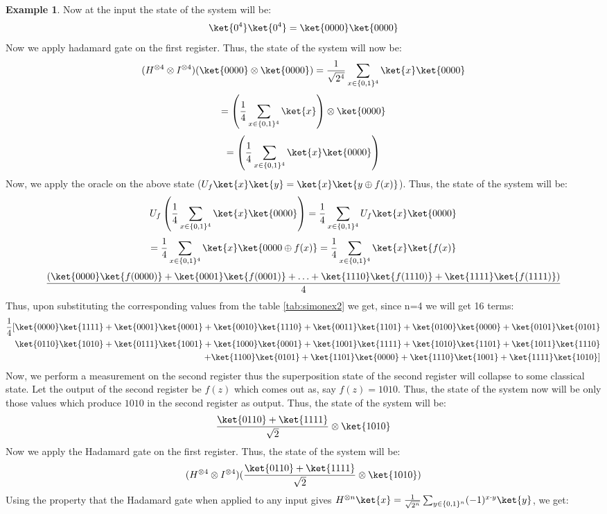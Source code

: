 \documentclass[12pt, oneside]{book}
\theoremstyle{definition}
\theoremstyle{definition}
\newtheorem{example}{Example}[section]
\theoremstyle{remark}
\begin{document}
\begin{example}
    Now at the input the state of the system will be:
    \[
        \ket{0^4}\ket{0^4}=\ket{0000}\ket{0000}
    \]
    Now we apply hadamard gate on the first register. Thus, the state of the system will now be:
    \[
        (H^{\otimes 4} \otimes I^{\otimes 4})(\ket{0000}\otimes \ket{0000})=\frac{1}{\sqrt{2^4}}\sum_{x \in \{0,1\}^4}\ket{x}\ket{0000}
    \]
    \[
        =\left(\frac{1}{4}\sum_{x \in \{0,1\}^4}\ket{x}\right) \otimes \ket{0000}
    \]
    \[
        =\left(\frac{1}{4}\sum_{x \in \{0,1\}^4}\ket{x}\ket{0000}\right)
    \]
    Now, we apply the oracle on the above state ($U_f\ket{x}\ket{y}=\ket{x}\ket{y\oplus f(x)}$). Thus, the state of the system will be:
    \[
    U_f\left(\frac{1}{4}\sum_{x \in \{0,1\}^4}\ket{x}\ket{0000}\right)=\frac{1}{4}\sum_{x \in \{0,1\}^4}U_f\ket{x}\ket{0000}
    \]
    \[
    =\frac{1}{4}\sum_{x\in\{0,1\}^4}\ket{x}\ket{0000 \oplus f(x)}=\frac{1}{4}\sum_{x \in \{0,1\}^4}\ket{x}\ket{f(x)}
    \]
    \[
        \frac{(\ket{0000}\ket{f(0000)}+\ket{0001}\ket{f(0001)}+\ldots +\ket{1110}\ket{f(1110)}+\ket{1111}\ket{f(1111)})}{4}
    \]
    Thus, upon substituting the corresponding values from the table \ref{tab:simonex2} we get, since n=4 we will get 16 terms:
    \begin{align*}
    \frac{1}{4}[\ket{0000}\ket{1111}+\ket{0001}\ket{0001}+\ket{0010}\ket{1110}+\ket{0011}\ket{1101}+\ket{0100}\ket{0000}+\ket{0101}\ket{0101}\\
    \ket{0110}\ket{1010}+\ket{0111}\ket{1001} +\ket{1000}\ket{0001}+\ket{1001}\ket{1111}+\ket{1010}\ket{1101}+\ket{1011}\ket{1110}\\
    +\ket{1100}\ket{0101}+\ket{1101}\ket{0000}+\ket{1110}\ket{1001}+\ket{1111}\ket{1010}]
    \end{align*}
    Now, we perform a measurement on the second register thus the superposition state of the second register will collapse to some classical state. Let the output of the second register be $f(z)$ which comes out as, say $f(z)=1010$.
    Thus, the state of the system now will be only those values which produce $1010$ in the second register as output. Thus, the state of the system will be:
    \[
    \frac{\ket{0110}+\ket{1111}}{\sqrt{2}}\otimes \ket{1010}
    \]
    Now we apply the Hadamard gate on the first register. Thus, the state of the system will be:
    \[
    (H^{\otimes 4}\otimes I^{\otimes 4})(\frac{\ket{0110}+\ket{1111}}{\sqrt{2}}\otimes \ket{1010})
    \]
    Using the property that the Hadamard gate when applied to any input gives $H^{\otimes n}\ket{x}=\frac{1}{\sqrt{2^n}}\sum_{y \in \{0,1\}^n}(-1)^{x\cdot y}\ket{y}$, we get:

\end{example}
\end{document}
